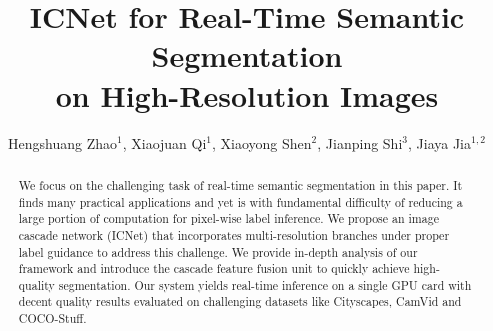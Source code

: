 \documentclass[runningheads]{llncs}
\begin{document}
%
\title{ICNet for Real-Time Semantic Segmentation\\ on High-Resolution Images}

%
\author{Hengshuang Zhao$^{1}$, Xiaojuan Qi$^{1}$, Xiaoyong Shen$^2$, Jianping Shi$^3$, Jiaya Jia$^{1,2}$}
%
%


%
\maketitle              %
\setcounter{footnote}{-1}
%
\begin{abstract}
We focus on the challenging task of real-time semantic segmentation in this paper. It finds many practical applications and yet is with fundamental difficulty of reducing a large portion of computation for pixel-wise label inference. We propose an image cascade network (ICNet) that incorporates multi-resolution branches under proper label guidance to address this challenge. We provide in-depth analysis of our framework and introduce the cascade feature fusion unit to quickly achieve high-quality segmentation. Our system yields real-time inference on a single GPU card with decent quality results evaluated on challenging datasets like Cityscapes, CamVid and COCO-Stuff.
\end{abstract}
%
%
%
\end{document}
